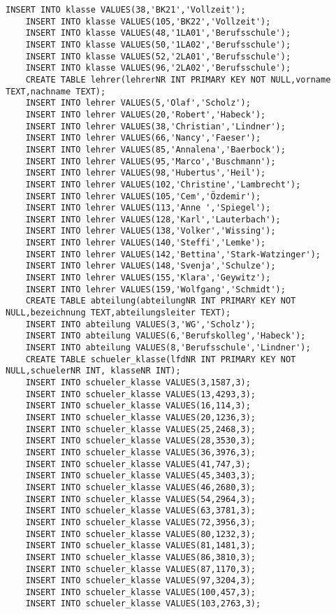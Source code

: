 \begin{lstlisting}[breaklines=True, numbers=none, basicstyle=\tiny, keepspaces=false]
	INSERT INTO klasse VALUES(38,'BK21','Vollzeit');
	INSERT INTO klasse VALUES(105,'BK22','Vollzeit');
	INSERT INTO klasse VALUES(48,'1LA01','Berufsschule');
	INSERT INTO klasse VALUES(50,'1LA02','Berufsschule');
	INSERT INTO klasse VALUES(52,'2LA01','Berufsschule');
	INSERT INTO klasse VALUES(96,'2LA02','Berufsschule');
	CREATE TABLE lehrer(lehrerNR INT PRIMARY KEY NOT NULL,vorname TEXT,nachname TEXT);
	INSERT INTO lehrer VALUES(5,'Olaf','Scholz');
	INSERT INTO lehrer VALUES(20,'Robert','Habeck');
	INSERT INTO lehrer VALUES(38,'Christian','Lindner');
	INSERT INTO lehrer VALUES(66,'Nancy','Faeser');
	INSERT INTO lehrer VALUES(85,'Annalena','Baerbock');
	INSERT INTO lehrer VALUES(95,'Marco','Buschmann');
	INSERT INTO lehrer VALUES(98,'Hubertus','Heil');
	INSERT INTO lehrer VALUES(102,'Christine','Lambrecht');
	INSERT INTO lehrer VALUES(105,'Cem','Özdemir');
	INSERT INTO lehrer VALUES(113,'Anne ','Spiegel');
	INSERT INTO lehrer VALUES(128,'Karl','Lauterbach');
	INSERT INTO lehrer VALUES(138,'Volker','Wissing');
	INSERT INTO lehrer VALUES(140,'Steffi','Lemke');
	INSERT INTO lehrer VALUES(142,'Bettina','Stark-Watzinger');
	INSERT INTO lehrer VALUES(148,'Svenja','Schulze');
	INSERT INTO lehrer VALUES(155,'Klara','Geywitz');
	INSERT INTO lehrer VALUES(159,'Wolfgang','Schmidt');
	CREATE TABLE abteilung(abteilungNR INT PRIMARY KEY NOT NULL,bezeichnung TEXT,abteilungsleiter TEXT);
	INSERT INTO abteilung VALUES(3,'WG','Scholz');
	INSERT INTO abteilung VALUES(6,'Berufskolleg','Habeck');
	INSERT INTO abteilung VALUES(8,'Berufsschule','Lindner');
	CREATE TABLE schueler_klasse(lfdNR INT PRIMARY KEY NOT NULL,schuelerNR INT, klasseNR INT);
	INSERT INTO schueler_klasse VALUES(3,1587,3);
	INSERT INTO schueler_klasse VALUES(13,4293,3);
	INSERT INTO schueler_klasse VALUES(16,114,3);
	INSERT INTO schueler_klasse VALUES(20,1236,3);
	INSERT INTO schueler_klasse VALUES(25,2468,3);
	INSERT INTO schueler_klasse VALUES(28,3530,3);
	INSERT INTO schueler_klasse VALUES(36,3976,3);
	INSERT INTO schueler_klasse VALUES(41,747,3);
	INSERT INTO schueler_klasse VALUES(45,3403,3);
	INSERT INTO schueler_klasse VALUES(46,2680,3);
	INSERT INTO schueler_klasse VALUES(54,2964,3);
	INSERT INTO schueler_klasse VALUES(63,3781,3);
	INSERT INTO schueler_klasse VALUES(72,3956,3);
	INSERT INTO schueler_klasse VALUES(80,1232,3);
	INSERT INTO schueler_klasse VALUES(81,1481,3);
	INSERT INTO schueler_klasse VALUES(86,3810,3);
	INSERT INTO schueler_klasse VALUES(87,1170,3);
	INSERT INTO schueler_klasse VALUES(97,3204,3);
	INSERT INTO schueler_klasse VALUES(100,457,3);
	INSERT INTO schueler_klasse VALUES(103,2763,3);

\end{lstlisting}
